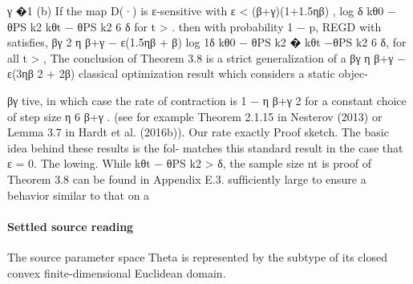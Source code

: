 \documentclass[10pt]{article}
\begin{document}
\begin{ReviewVerbatim}
                                                                                                                                 γ
                                               �1                             (b) If the map D(·) is ε-sensitive with ε < (β+γ)(1+1.5ηβ)  ,
                                         log    δ kθ0 − θPS k2
     kθt − θPS k2 6 δ for t >                                             .       then with probability 1 − p, REGD with satisﬁes,
                                          βγ          2
                                 η       β+γ − ε(1.5ηβ + β)
                                                                                                                    log 1δ kθ0 − θPS k2
                                                                                                                        �
                                                                                  kθt −θPS k2 6 δ, for all t >                              ,
The conclusion of Theorem 3.8 is a strict generalization of a                                                        βγ
                                                                                                                 η β+γ    − ε(3ηβ 2 + 2β)
classical optimization result which considers a static objec-

                                                        βγ
tive, in which case the rate of contraction is 1 − η β+γ                                                                   2
                                                                                   for a constant choice of step size η 6 β+γ .
(see for example Theorem 2.1.15 in Nesterov (2013) or
Lemma 3.7 in Hardt et al. (2016b)). Our rate exactly                          Proof sketch. The basic idea behind these results is the fol-
matches this standard result in the case that ε = 0. The                      lowing. While kθt − θPS k2 > δ, the sample size nt is
proof of Theorem 3.8 can be found in Appendix E.3.                            sufﬁciently large to ensure a behavior similar to that on a
\end{ReviewVerbatim}

\paragraph{Settled source reading}
\begin{sloppypar}
The source parameter space Theta is represented by the subtype of its closed convex finite-\allowbreak{}dimensional Euclidean domain.\allowbreak{}
\end{sloppypar}
\end{document}
